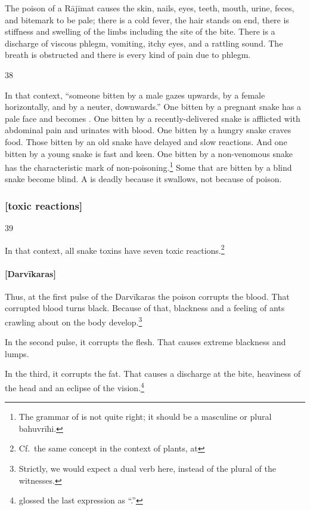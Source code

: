 \begin{translation}
The poison of a Rājīmat causes the skin, nails, eyes, teeth, mouth,
urine, feces, and bitemark to be pale; there  is a cold fever, the hair
stands on end, there is stiffness and swelling of the limbs including the
site of the bite. There is a discharge of viscous phlegm, vomiting, itchy
eyes, and a rattling sound.  The breath is obstructed and there is every
kind of pain due to phlegm.


\item[38]

In that context, “someone bitten by a male gazes upwards,   by a female
horizontally, and by a neuter, downwards.” One bitten by a pregnant snake
has a pale face and becomes . One bitten by a
recently-delivered snake is afflicted with abdominal pain and urinates
with blood. One bitten by a hungry snake craves food.  Those bitten by an
old snake have delayed and slow reactions. And one bitten by a young
snake is fast and keen.  One bitten by a non-venomous snake has the
characteristic mark of non-poisoning.\footnote{The grammar of
     is not quite right; it should be a masculine or plural
    bahuvrīhi.} Some that are bitten by a blind snake become blind.  A
     is deadly because it swallows, not because of
    poison.

\subsubsection{[toxic reactions]}

\item[39]

In that context, all snake toxins have seven toxic reactions.\footnote{Cf.\ the same concept in the context of plants, at 
\pageref{stagesofshock}}

\paragraph{[Darvīkaras]}   

Thus, at the first pulse of the Darvīkaras the poison corrupts the blood.
That corrupted blood turns black.  Because of that, blackness and a
feeling of ants crawling about on the body develop.\footnote{Strictly, we
    would expect a dual verb here, instead of the plural of the witnesses.}

In the second pulse, it corrupts the flesh.  That causes extreme blackness and  
lumps. 

In the third, it corrupts the fat. That causes a discharge at the bite,
heaviness of the head and an eclipse of the
vision.\footnote{ glossed the last expression as
    “.”}
    

\end{translation}
